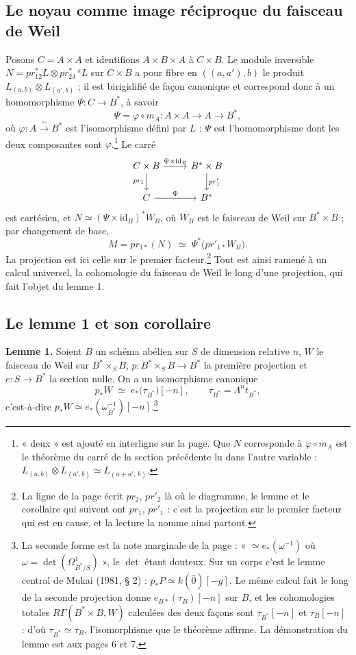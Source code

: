 \documentclass[11pt,a4paper]{article}
\begin{document}
\subsection*{Le noyau comme image réciproque du faisceau de Weil}

Posons $C = A \times A$ et identifions $A \times B \times A$ à $C \times B$.
Le module inversible $N = pr_{12}^{*}L \otimes pr_{23}^{*}\,{}^{s}L$ sur
$C \times B$ a pour fibre en $((a, a'), b)$ le produit $L_{(a,b)} \otimes
L_{(a',b)}$ ; il est birigidifié de façon canonique et correspond donc à un
homomorphisme $\Psi \colon C \to B^{*}$, à savoir
\[
  \Psi = \varphi \circ m_A \colon A \times A \longrightarrow A \longrightarrow B^{*},
\]
où $\varphi \colon A \xrightarrow{\;\sim\;} B^{*}$ est l'isomorphisme défini
par $L$ : $\Psi$ est l'homomorphisme dont les deux composantes sont
$\varphi$.\footnote{« deux » est ajouté en interligne sur la page. Que $N$
corresponde à $\varphi \circ m_A$ est le théorème du carré de la section
précédente lu dans l'autre variable : $L_{(a,b)} \otimes L_{(a',b)} \simeq
L_{(a+a',\,b)}$.} Le carré
\[
\begin{tikzcd}
C \times B \arrow[r, "\Psi \times \mathrm{id}_B"] \arrow[d, "pr_1"'] & B^{*} \times B \arrow[d, "pr'_1"] \\
C \arrow[r, "\Psi"] & B^{*}
\end{tikzcd}
\]
est cartésien, et $N \simeq (\Psi \times \mathrm{id}_B)^{*}W_B$, où $W_B$
est le faisceau de Weil sur $B^{*} \times B$ ; par changement de base,
\[
  M = pr_{1*}(N) \;\simeq\; \Psi^{*}\bigl(pr'_{1*}W_B\bigr).
\]
La projection est ici celle sur le premier facteur.\footnote{La ligne de la page écrit $pr_2$, $pr'_2$ là où le diagramme, le
lemme et le corollaire qui suivent ont $pr_1$, $pr'_1$ : c'est la projection
sur le premier facteur qui est en cause, et la lecture la nomme ainsi
partout.} Tout est ainsi ramené à un calcul universel, la cohomologie du
faisceau de Weil le long d'une projection, qui fait l'objet du lemme 1.

\subsection*{Le lemme 1 et son corollaire}

\textbf{Lemme 1.} Soient $B$ un schéma abélien sur $S$ de dimension relative
$n$, $W$ le faisceau de Weil sur $B^{*} \times_S B$, $p \colon B^{*} \times_S
B \to B^{*}$ la première projection et $e \colon S \to B^{*}$ la section
nulle. On a un isomorphisme canonique
\[
  p_{*}W \;\simeq\; e_{*}\bigl(\tau_{B^{*}}\bigr)[-n],
  \qquad \tau_{B^{*}} = \Lambda^{n}t_{B^{*}},
\]
c'est-à-dire $p_{*}W \simeq e_{*}(\omega_{B^{*}}^{-1})[-n]$.\footnote{La
seconde forme est la note marginale de la page : « $\simeq e_{*}(\omega^{-1})$
où $\omega = \det(\Omega^{1}_{B^{*}/S})$ », le $\det$ étant douteux. Sur un
corps c'est le lemme central de Mukai (1981, § 2) : $p_{*}P \simeq
k(\hat 0)[-g]$. Le même calcul fait le long de la seconde projection donne
$e_{B*}(\tau_B)[-n]$ sur $B$, et les cohomologies totales
$R\Gamma(B^{*} \times B, W)$ calculées des deux façons sont $\tau_{B^{*}}[-n]$
et $\tau_B[-n]$ : d'où $\tau_{B^{*}} \simeq \tau_B$, l'isomorphisme que le
théorème affirme. La démonstration du lemme est aux pages 6 et 7.}
\end{document}
